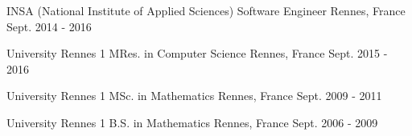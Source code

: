 

\begin{cventries}

  \cventryfour
    {INSA (National Institute of Applied Sciences)} %
    {Software Engineer} %
    {Rennes, France} %
    {Sept. 2014 - 2016} %

  \cventryfour
    {University Rennes 1} %
    {MRes. in Computer Science} %
    {Rennes, France} %
    {Sept. 2015 - 2016} %

  \cventryfour
    {University Rennes 1} %
    {MSc. in Mathematics} %
    {Rennes, France} %
    {Sept. 2009 - 2011} %

  \cventryfour
    {University Rennes 1} %
    {B.S. in Mathematics} %
    {Rennes, France} %
    {Sept. 2006 - 2009} %

\end{cventries}
